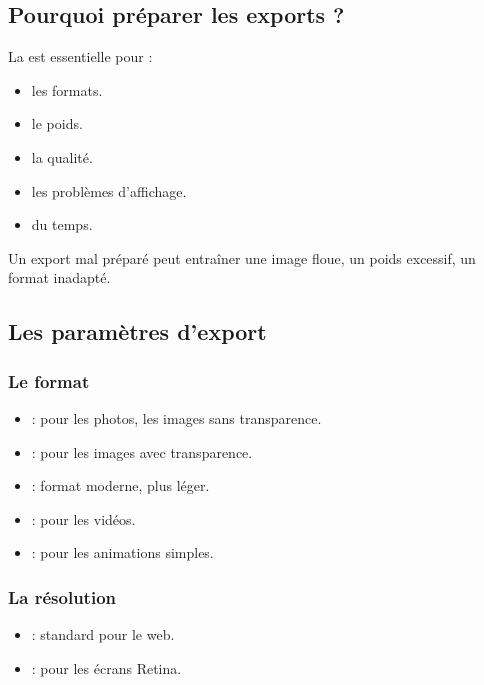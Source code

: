 \subsection{Pourquoi préparer les exports ?}

La  est essentielle pour :

\begin{itemize}
    \item {} les formats.
    \item {} le poids.
    \item {} la qualité.
    \item {} les problèmes d'affichage.
    \item {} du temps.
\end{itemize}

Un export mal préparé peut entraîner une image floue, un poids excessif, un format inadapté.

\subsection{Les paramètres d'export}

\subsubsection{Le format}

\begin{itemize}
    \item {} : pour les photos, les images sans transparence.
    \item {} : pour les images avec transparence.
    \item {} : format moderne, plus léger.
    \item {} : pour les vidéos.
    \item {} : pour les animations simples.
\end{itemize}

\subsubsection{La résolution}

\begin{itemize}
    \item {} : standard pour le web.
    \item {} : pour les écrans Retina.
\end{itemize}

